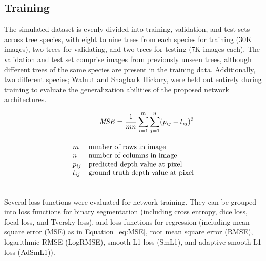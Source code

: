 \subsection{Training}
\label{subsec:training}
The simulated dataset is evenly divided into training, validation, and test sets across tree species, with eight to nine trees from each species for training (30K images), two trees for validating, and two trees for testing (7K images each). The validation and test set comprise images from previously unseen trees, although different trees of the same species are present in the training data. Additionally, two different species; Walnut and Shagbark Hickory, were held out entirely during training to evaluate the generalization abilities of the proposed network architectures.

{\small
\begin{align}
\label{eq:MSE}
\vspace{\figurevspaceabove}
\mathit{MSE}=\frac{1}{mn} \sum_{i=1}^m \sum_{j=1}^n (p_{ij}-t_{ij})^2\\[2ex]
\begin{array}{@{} l >{$}l<{$} @{}}
m      & number of rows in image\\ \nonumber
n      & number of columns in image\\ \nonumber
p_{ij} & predicted depth value at pixel\\ \nonumber
t_{ij} & ground truth depth value at pixel \nonumber
\end{array} \\ \nonumber
\vspace{-0.6cm}
\end{align}
}%


Several loss functions were evaluated for network training. They can be grouped into loss functions for binary segmentation (including cross entropy, dice loss, focal loss, and Tversky loss), and loss functions for regression (including mean square error (MSE) as in Equation~\ref{eq:MSE}, root mean square error (RMSE), logarithmic RMSE (LogRMSE), smooth L1 loss (SmL1), and adaptive smooth L1 loss (AdSmL1)). 

